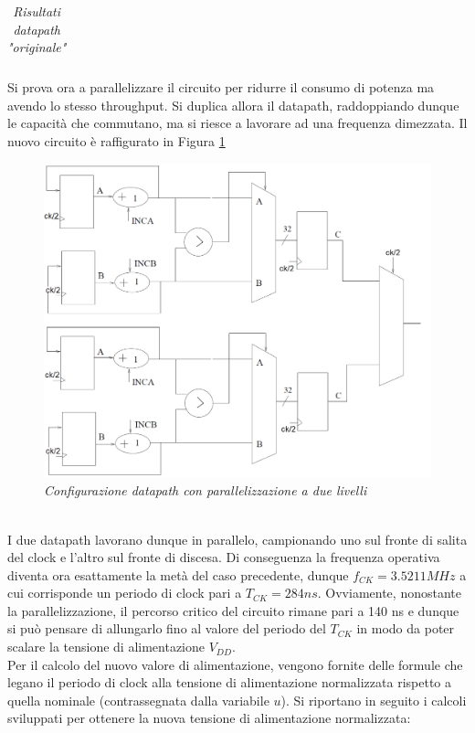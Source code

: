 {\begin{table}[!h]
\begin{tabular}{|c|c|}
		\hline
	\end{tabular}
	\caption{\textit{Risultati datapath "originale"}}
	\label{Tab33_2}
\end{table}
\newpage
\noindent Si prova ora a parallelizzare il circuito per ridurre il consumo di potenza ma avendo lo stesso throughput. Si duplica allora il datapath, raddoppiando dunque le capacità che commutano, ma si riesce a lavorare ad una frequenza dimezzata. Il nuovo circuito è raffigurato in Figura \ref{circuito_parallel}
\begin{figure}[!htb]
	\centering
	\includegraphics[scale=0.8]{immagini/circuito_parallel}
	\caption{\textit{Configurazione datapath con parallelizzazione a due livelli}}
	\label{circuito_parallel}
\end{figure}
\\
I due datapath lavorano dunque in parallelo, campionando uno sul fronte di salita del clock e l'altro sul fronte di discesa. Di conseguenza la frequenza operativa diventa ora esattamente la metà del caso precedente, dunque $f_{CK}=3.5211 MHz$ a cui corrisponde un periodo di clock pari a $T_{CK}=284 ns$. Ovviamente, nonostante la parallelizzazione, il percorso critico del circuito rimane pari a 140 ns e dunque si può pensare di allungarlo fino al valore del periodo del $T_{CK}$ in modo da poter scalare la tensione di alimentazione $V_{DD}$.\\
Per il calcolo del nuovo valore di alimentazione, vengono fornite delle formule che legano il periodo di clock alla tensione di alimentazione normalizzata rispetto a quella nominale (contrassegnata dalla variabile $u$). Si riportano in seguito i calcoli sviluppati per ottenere la nuova tensione di alimentazione normalizzata:
}
